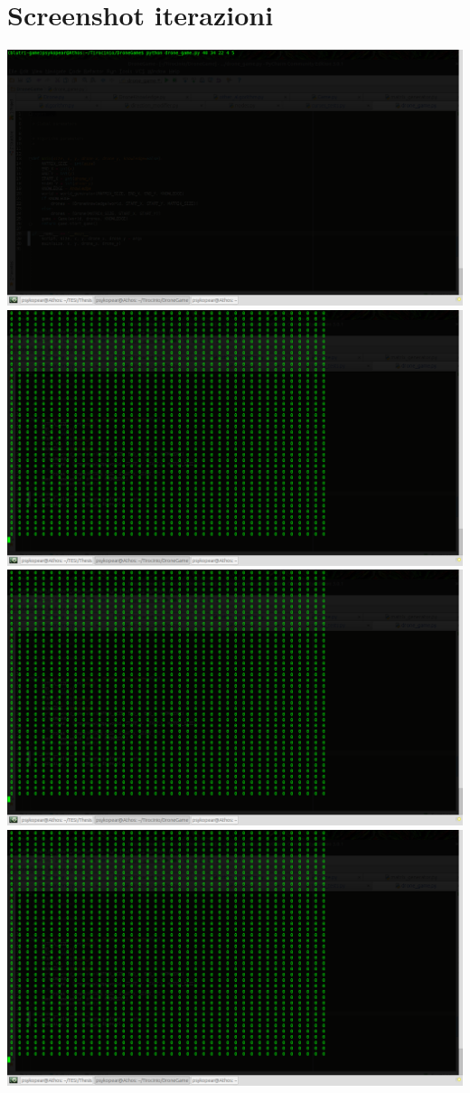 \section{Screenshot iterazioni}
\includegraphics[width=\textwidth]{immagini/Run1.png}
\includegraphics[width=\textwidth]{immagini/Run2.png}
\includegraphics[width=\textwidth]{immagini/Run3.png}
\includegraphics[width=\textwidth]{immagini/Run4.png}
